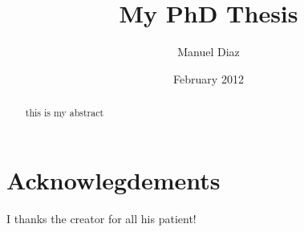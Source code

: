 \documentclass[a4paper]{report}
\begin{document}
\title{My PhD Thesis}
\author{Manuel Diaz}
\date{February 2012}
\maketitle

\tableofcontents

\chapter*{Acknowlegdements}
I thanks the creator for all his patient!

\begin{abstract}
this is my abstract
\end{abstract}








\end{document}
